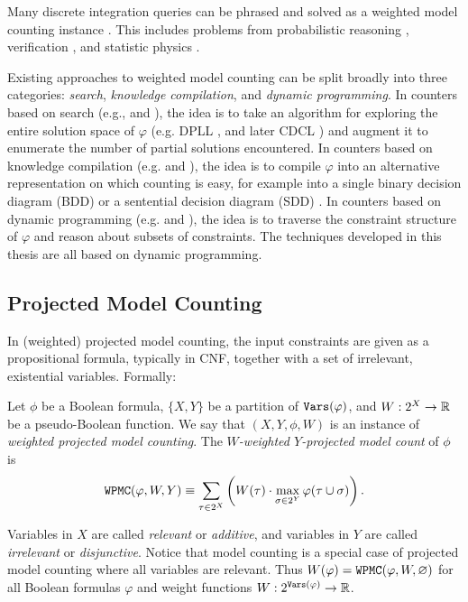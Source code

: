 Many discrete integration queries can be phrased and solved as a weighted model counting instance \cite{GSS08}. 
This includes problems from probabilistic reasoning \cite{DH07,Bacchus2003}, verification \cite{naveh2007constraint}, and statistic physics \cite{jerrum1993polynomial}.

Existing approaches to weighted model counting can be split broadly into three categories: \emph{search}, \emph{knowledge compilation}, and \emph{dynamic programming}. 
In counters based on search (e.g.,   \cite{SBK05} and  \cite{Thurley2006}), the idea is to take an algorithm for exploring the entire solution space of $\varphi$ (e.g. DPLL \cite{davis1960computing,davis1962machine}, and later CDCL \cite{biere2009conflict}) and augment it to enumerate the number of partial solutions encountered. 
In counters based on knowledge compilation (e.g.  \cite{OD15} and  \cite{LM17}), the idea is to compile $\varphi$ into an alternative representation on which counting is easy, for example into a single binary decision diagram (BDD) \cite{akers1978binary} or a sentential decision diagram (SDD) \cite{darwiche2011sdd}.
In counters based on dynamic programming (e.g.  \cite{DPV20} and  \cite{FHWZ18,FHZ19}), the idea is to traverse the constraint structure of $\varphi$ and reason about subsets of constraints. 
The techniques developed in this thesis are all based on dynamic programming.

\subsection{Projected Model Counting}
In (weighted) projected model counting, the input constraints are given as a propositional formula, typically in CNF, together with a set of irrelevant, existential variables.
Formally:
\begin{definition}
	Let $\phi$ be a Boolean formula, $\{X, Y\}$ be a partition of $\texttt{\upshape Vars}(\varphi)$, and $W: 2^X \to \mathbb{R}$ be a pseudo-Boolean function. We say that $(X, Y, \phi, W)$ is an instance of \emph{weighted projected model counting}.
	The \emph{$W$-weighted $Y$-projected model count} of $\phi$ is
	$$\texttt{\upshape WPMC}(\varphi, W, Y) \equiv \sum_{\tau \in 2^X} \left(  W(\tau) \cdot \max_{\sigma \in 2^Y} \varphi(\tau \cup \sigma)  \right).$$
\end{definition}

Variables in $X$ are called \emph{relevant} or \emph{additive}, and variables in $Y$ are called \emph{irrelevant} or \emph{disjunctive}. 
Notice that model counting is a special case of projected model counting where all variables are relevant. Thus $W(\varphi) = \texttt{\upshape WPMC}(\varphi, W, \varnothing)$ for all Boolean formulas $\varphi$ and weight functions $W: 2^{\texttt{\upshape Vars}(\varphi)} \rightarrow \mathbb{R}$. 

